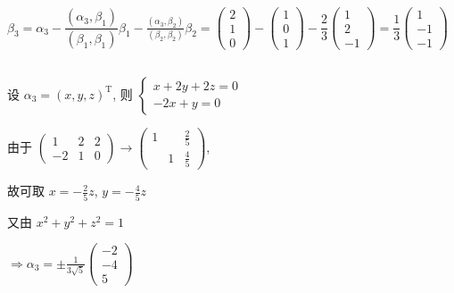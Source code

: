 		 \( \beta_{3} = \alpha_{3} - \dfrac{(\alpha_{3}, \beta_{1})}{(\beta_{1}, \beta_{1})} \beta_{1} - \frac{(\alpha_{3}, \beta_{2})}{(\beta_{2}, \beta_{2})} \beta_{2} =
		 \begin{pmatrix}
			 2 \\
			 1 \\
			 0\end{pmatrix} -
		 \begin{pmatrix}
			 1 \\
			 0 \\
			 1\end{pmatrix} - \dfrac{2}{3}
		 \begin{pmatrix}
			 1 \\
			 2 \\
			 -1
		 \end{pmatrix} = \dfrac{1}{3}
		 \begin{pmatrix}
			 1  \\
			 -1 \\
			 -1\end{pmatrix} \)


 \subsection{} %

	 \paragraph{} %
		 设 \( \alpha_{3} = (x, y, z)^{\mathrm{T}} \), 则 \( \begin{cases} x + 2y + 2z = 0 \\ -2x + y = 0 \end{cases} \)

		 由于 \( \begin{pmatrix} 1 & 2 & 2 \\ -2 & 1 & 0 \end{pmatrix} \to \begin{pmatrix} 1 & & \frac{2}{5} \\ & 1 & \frac{4}{5} \end{pmatrix} \),

		 故可取 \( x = -\frac{2}{5}z \), \( y = -\frac{4}{5}z \)

		 又由 \( x^{2} + y^{2} + z^{2} = 1 \)

		 \(\Rightarrow \alpha_{3} = \pm \frac{1}{3\sqrt{5}} \begin{pmatrix} -2 \\ -4 \\ 5 \end{pmatrix} \)

